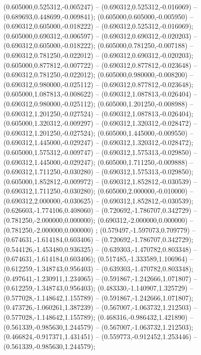  (0.605000,0.525312,-0.005247) -- (0.690312,0.525312,-0.016069) -- (0.689693,0.448699,-0.009841);
 (0.605000,0.605000,-0.005950) -- (0.690312,0.605000,-0.018222) -- (0.690312,0.525312,-0.016069);
 (0.605000,0.690312,-0.006597) -- (0.690312,0.690312,-0.020203) -- (0.690312,0.605000,-0.018222);
 (0.605000,0.781250,-0.007188) -- (0.690312,0.781250,-0.022012) -- (0.690312,0.690312,-0.020203);
 (0.605000,0.877812,-0.007722) -- (0.690312,0.877812,-0.023648) -- (0.690312,0.781250,-0.022012);
 (0.605000,0.980000,-0.008200) -- (0.690312,0.980000,-0.025112) -- (0.690312,0.877812,-0.023648);
 (0.605000,1.087813,-0.008622) -- (0.690312,1.087813,-0.026404) -- (0.690312,0.980000,-0.025112);
 (0.605000,1.201250,-0.008988) -- (0.690312,1.201250,-0.027524) -- (0.690312,1.087813,-0.026404);
 (0.605000,1.320312,-0.009297) -- (0.690312,1.320312,-0.028472) -- (0.690312,1.201250,-0.027524);
 (0.605000,1.445000,-0.009550) -- (0.690312,1.445000,-0.029247) -- (0.690312,1.320312,-0.028472);
 (0.605000,1.575312,-0.009747) -- (0.690312,1.575313,-0.029850) -- (0.690312,1.445000,-0.029247);
 (0.605000,1.711250,-0.009888) -- (0.690312,1.711250,-0.030280) -- (0.690312,1.575313,-0.029850);
 (0.605000,1.852812,-0.009972) -- (0.690312,1.852812,-0.030539) -- (0.690312,1.711250,-0.030280);
 (0.605000,2.000000,-0.010000) -- (0.690312,2.000000,-0.030625) -- (0.690312,1.852812,-0.030539);
 (0.626603,-1.774106,0.408060) -- (0.720692,-1.786707,0.342729) -- (0.781250,-2.000000,0.000000);
 (0.690312,-2.000000,0.000000) -- (0.781250,-2.000000,0.000000) ;
 (0.579497,-1.597073,0.709779) -- (0.674631,-1.614184,0.603406) -- (0.720692,-1.786707,0.342729);
 (0.544126,-1.453480,0.936325) -- (0.639303,-1.470782,0.803348) -- (0.674631,-1.614184,0.603406);
 (0.517485,-1.333589,1.106964) -- (0.612259,-1.348743,0.956403) -- (0.639303,-1.470782,0.803348);
 (0.497641,-1.230911,1.234065) -- (0.591867,-1.242666,1.071807) -- (0.612259,-1.348743,0.956403);
 (0.483330,-1.140907,1.325729) -- (0.577028,-1.148642,1.155789) -- (0.591867,-1.242666,1.071807);
 (0.473726,-1.060261,1.387239) -- (0.567007,-1.063732,1.212503) -- (0.577028,-1.148642,1.155789);
 (0.468316,-0.986432,1.421890) -- (0.561339,-0.985630,1.244579) -- (0.567007,-1.063732,1.212503);
 (0.466824,-0.917371,1.431451) -- (0.559773,-0.912452,1.253446) -- (0.561339,-0.985630,1.244579);
